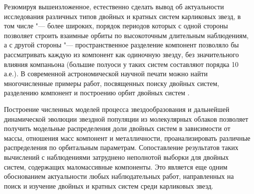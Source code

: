Резюмируя вышеизложенное, естественно сделать вывод об актуальности исследования различных типов двойных и кратных систем карликовых звезд, в том числе "--- более широких, порядок периодов которых с одной стороны позволяет строить взаимные орбиты по высокоточным длительным наблюдениям, а с другой стороны "--- пространственное разделение компонент позволяло бы рассматривать каждую из компонент как одиночную звезду, без значительного влияния компаньона (большие полуоси у таких систем составляют порядка 10 а.е.). В современной астрономической научной печати можно найти многочисленные примеры работ, посвященных поиску двойных систем, разделению компонент и построению орбит двойных систем  .  

Построение численных моделей процесса звездообразования и дальнейшей динамической эволюции звездной популяции из молекулярных облаков позволяет получить модельные распределения доли двойных систем в зависимости от массы, отношения масс компонент и металличности, проанализировать различные распределения по орбитальным параметрам. Сопоставление результатов таких вычислений с наблюдениями затруднено неполнотой выборки для двойных систем, содержащих маломассивные компоненты. Это является еще одним обоснованием актуальности любых наблюдательных работ, направленных на поиск и изучение двойных и кратных систем среди карликовых звезд.

